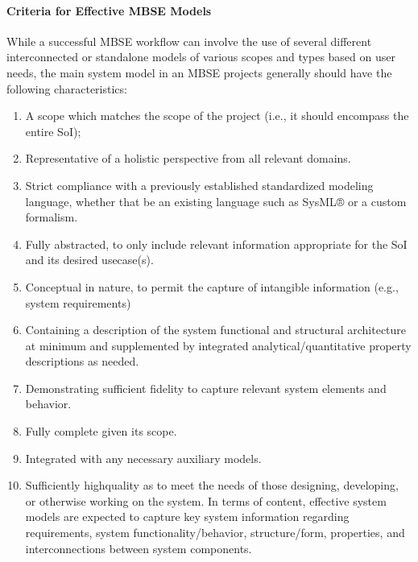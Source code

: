 \documentclass[letterpaper,10pt,english]{jupyterBook}
\begin{document}
\paragraph{Criteria for Effective MBSE Models}
\label{\detokenize{SE/sebok:criteria-for-effective-mbse-models}}
\sphinxAtStartPar
While a successful MBSE workflow can involve the use of several different interconnected or standalone models of various scopes and types based on user needs, the main system model in an MBSE projects generally should have
the following characteristics:
\begin{enumerate}
%
\item {} 
\sphinxAtStartPar
A scope which matches the scope of the project (i.e., it should encompass the entire SoI);

\item {} 
\sphinxAtStartPar
Representative of a holistic perspective from all relevant domains.

\item {} 
\sphinxAtStartPar
Strict compliance with a previously established standardized modeling language, whether that be an existing language such as SysML® or a custom formalism.

\item {} 
\sphinxAtStartPar
Fully abstracted, to only include relevant information appropriate for the SoI and its desired use\sphinxhyphen{}case(s).

\item {} 
\sphinxAtStartPar
Conceptual in nature, to permit the capture of intangible information (e.g., system requirements)

\item {} 
\sphinxAtStartPar
Containing a description of the system functional and structural architecture at minimum and supplemented by
integrated analytical/quantitative property descriptions as needed.

\item {} 
\sphinxAtStartPar
Demonstrating sufficient fidelity to capture relevant system elements and behavior.

\item {} 
\sphinxAtStartPar
Fully complete given its scope.

\item {} 
\sphinxAtStartPar
Integrated with any necessary auxiliary models.

\item {} 
\sphinxAtStartPar
Sufficiently high\sphinxhyphen{}quality as to meet the needs of those designing, developing, or otherwise working on the system.
In terms of content, effective system models are expected to capture key system information regarding requirements, system functionality/behavior, structure/form, properties, and interconnections between system components.

\end{enumerate}
\end{document}
